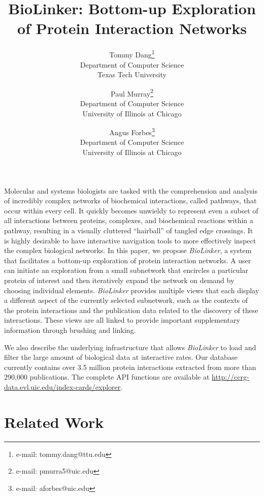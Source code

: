 \documentclass[journal]{vgtc}                %
\title{BioLinker: Bottom-up Exploration of Protein Interaction Networks}
\author{Tommy Dang\thanks{e-mail: tommy.dang@ttu.edu}\\ %
        \scriptsize Department of Computer Science \\ \scriptsize Texas Tech University %
\and Paul Murray\thanks{e-mail: pmurra5@uic.edu}\\ %
     \scriptsize Department of Computer Science \\ \scriptsize University of Illinois at Chicago %
\and Angus Forbes\thanks{e-mail: aforbes@uic.edu}\\ %
     \scriptsize Department of Computer Science \\ \scriptsize University of Illinois at Chicago %
} %
\newcommand{\theName}{\textit{BioLinker}}
\begin{document}



\maketitle

Molecular and systems biologists are tasked with the comprehension and analysis of incredibly complex networks of biochemical interactions, called pathways, that occur within every cell. It quickly becomes unwieldy to represent even a subset of all interactions between proteins, complexes, and biochemical reactions within a pathway, resulting in a visually cluttered ``hairball'' of tangled edge crossings. It is highly desirable to have interactive navigation tools to more effectively inspect the complex biological networks. In this paper, we propose \theName{}, a system that facilitates a bottom-up exploration of protein interaction networks. A user can initiate an exploration from a small subnetwork that encircles a particular protein of interest and then iteratively expand the network on demand by choosing individual elements. \theName{} provides multiple views that each display a different aspect of the currently selected subnetwork, such as the contexts of the protein interactions and the publication data related to the discovery of these interactions. These views are all linked to provide important supplementary information through brushing and linking.

We also describe the underlying infrastructure that allows \theName{} to load and filter the large amount of biological data at interactive rates. Our database currently contains over 3.5 million protein interactions extracted from more than 290,000 publications. The complete API functions are available at \url{http://ccrg-data.evl.uic.edu/index-cards/explorer}.

\section{Related Work}
\end{document}
